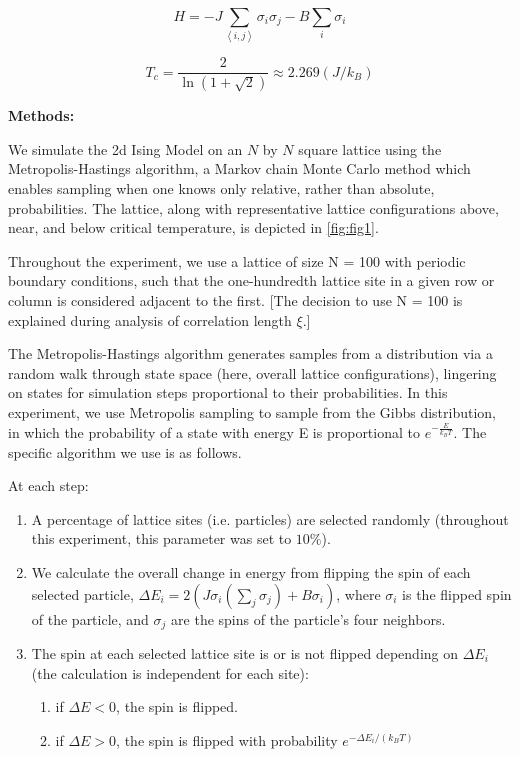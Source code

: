 \documentclass[letter,scriptaddress,twocolumn, prl]{revtex4}
\begin{document}
\begin{equation}
	\label{eq:hamiltonian}
	H = -J \sum_{\left\langle i, j \right\rangle}\sigma_i\sigma_j - B \sum_i\sigma_i
\end{equation}

\begin{equation}
	\label{eq:Tc}
	T_c = \frac{2}{\ln{(1+\sqrt{2})}} \approx 2.269 (J/k_B)
\end{equation}

\textbf{Methods:}

We simulate the 2d Ising Model on an $N$ by $N$ square lattice using the Metropolis-Hastings algorithm, a Markov chain Monte Carlo method which enables sampling when one knows only relative, rather than absolute, probabilities. The lattice, along with representative lattice configurations above, near, and below critical temperature, is depicted in \autoref{fig:fig1}.

Throughout the experiment, we use a lattice of size N = 100 with periodic boundary conditions, such that the one-hundredth lattice site in a given row or column is considered adjacent to the first. [The decision to use N = 100 is explained during analysis of correlation length $\xi$.]

The Metropolis-Hastings algorithm generates samples from a distribution via a random walk through state space (here, overall lattice configurations), lingering on states for simulation steps proportional to their probabilities. In this experiment, we use Metropolis sampling to sample from the Gibbs distribution, in which the probability of a state with energy E is proportional to $e^{-\frac{E}{k_BT}}$. The specific algorithm we use is as follows.

At each step:
\begin{enumerate}
	\item A percentage of lattice sites (i.e. particles) are selected randomly (throughout this experiment, this parameter was set to $10\%$).
	\item We calculate the overall change in energy from flipping the spin of each selected particle, $\Delta E_i = 2(J\sigma_i(\sum_j\sigma_j) + B\sigma_i)$, where $\sigma_i$ is the flipped spin of the particle, and $\sigma_j$ are the spins of the particle's four neighbors.
	\item The spin at each selected lattice site is or is not flipped depending on $\Delta E_i$ (the calculation is independent for each site):
	\begin{enumerate}
		\item if $\Delta E < 0$, the spin is flipped.
		\item if $\Delta E > 0$, the spin is flipped with probability $e^{-\Delta E_i/(k_BT)}$
	\end{enumerate}
\end{enumerate}
\end{document}

